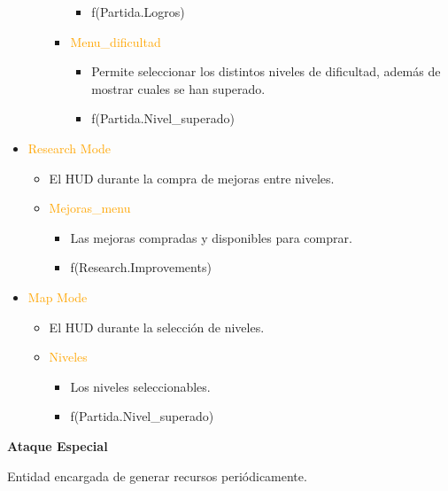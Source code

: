 \documentclass{article}
\begin{document}
\begin{itemize}
\begin{itemize}
\begin{itemize}
\begin{itemize}
			    \item f(Partida.Logros)
		    \end{itemize}
		    \item \textcolor{Orange}{Menu\_dificultad}
		    \begin{itemize}
			    \item Permite seleccionar los distintos niveles de dificultad, además de mostrar cuales se han superado.
			    \item f(Partida.Nivel\_superado)
		    \end{itemize}
		\end{itemize}
    \end{itemize}
    \item \textcolor{Orange}{Research Mode}
    \begin{itemize}
		\item El HUD durante la compra de mejoras entre niveles.
		\item \textcolor{Orange}{Mejoras\_menu}
		\begin{itemize}
			\item Las mejoras compradas y disponibles para comprar.
			\item f(Research.Improvements)
		\end{itemize}
    \end{itemize}
	\item \textcolor{Orange}{Map Mode}
    \begin{itemize}
		\item El HUD durante la selección de niveles.
		\item \textcolor{Orange}{Niveles}
		\begin{itemize}
			\item Los niveles seleccionables.
			\item f(Partida.Nivel\_superado)
		\end{itemize}
    \end{itemize}
\end{itemize}

\clearpage

\noindent \textbf{Ataque Especial}

\hfill \break \noindent Entidad encargada de generar recursos periódicamente.
\end{document}
